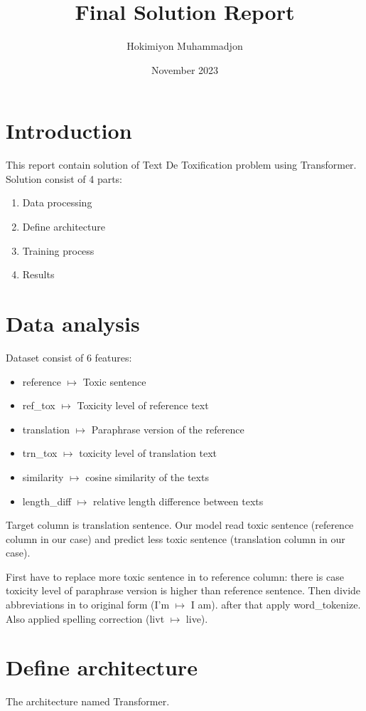 \documentclass{article}
\title{Final Solution Report}
\author{Hokimiyon Muhammadjon}
\date{November 2023}
\begin{document}
\maketitle

\section{Introduction}
This report contain solution of Text De Toxification problem using Transformer. Solution consist of 4 parts:
\begin{enumerate}
    \item Data processing
    \item Define architecture
    \item Training process
    \item Results
\end{enumerate}

\section{Data analysis}
Dataset consist of 6 features: 
\begin{itemize}
    \item reference $\mapsto$ Toxic sentence
    \item ref\_tox $\mapsto$ Toxicity level of reference text
    \item translation $\mapsto$ Paraphrase version of the reference
    \item trn\_tox $\mapsto$ toxicity level of translation text
    \item similarity $\mapsto$ cosine similarity of the texts
    \item length\_diff $\mapsto$ relative length difference between texts
\end{itemize}
Target column is translation sentence. Our model read toxic sentence (reference column in our case) and predict less toxic sentence (translation column in our case).

First have to replace more toxic sentence in to reference column: there is case toxicity level of paraphrase version is higher than reference sentence. Then divide abbreviations in to original form (I'm $\mapsto$ I am). after that apply word\_tokenize. Also applied spelling correction (livt $\mapsto$ live).

\section{Define architecture}
The architecture named Transformer. 
\end{document}
